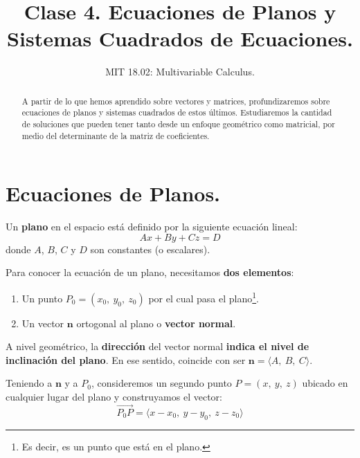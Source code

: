 \documentclass[12pt]{article}
\title{Clase 4. Ecuaciones de Planos y Sistemas Cuadrados de Ecuaciones.}
\author{MIT 18.02: Multivariable Calculus.}
\date{}
\begin{document}
\maketitle

\begin{abstract}
\noindent A partir de lo que hemos aprendido sobre vectores y matrices, profundizaremos sobre ecuaciones de planos y sistemas cuadrados de estos últimos. Estudiaremos la cantidad de soluciones que pueden tener tanto desde un enfoque geométrico como matricial, por medio del determinante de la matriz de coeficientes.
\end{abstract}


\section{Ecuaciones de Planos.}

Un \textbf{plano} en el espacio está definido por la siguiente ecuación lineal:
\[
  Ax + By + Cz = D
\]
donde $A$, $B$, $C$ y $D$ son constantes (o escalares).

Para conocer la ecuación de un plano, necesitamos \textbf{dos elementos}:

\begin{enumerate}
\item Un punto $P_{0} = (x_{0}, \ y_{0}, \ z_{0})$ por el cual pasa el plano\footnote{Es decir, es un punto que está en el plano.}.
\item Un vector $\mathbf{n}$ ortogonal al plano o \textbf{vector normal}.
\end{enumerate}

A nivel geométrico, la \textbf{dirección} del vector normal \textbf{indica el nivel de inclinación del plano}. En ese sentido, coincide con ser $\mathbf{n} = \langle A, \ B, \ C \rangle$.

Teniendo a $\mathbf{n}$ y a $P_{0}$, consideremos un segundo punto $P = (x, \ y, \ z)$ ubicado en cualquier lugar del plano y construyamos el vector:
\[
  \overrightarrow{P_{0}P} = \langle x - x_{0}, \ y - y_{0}, \ z - z_{0} \rangle
\]
\end{document}
